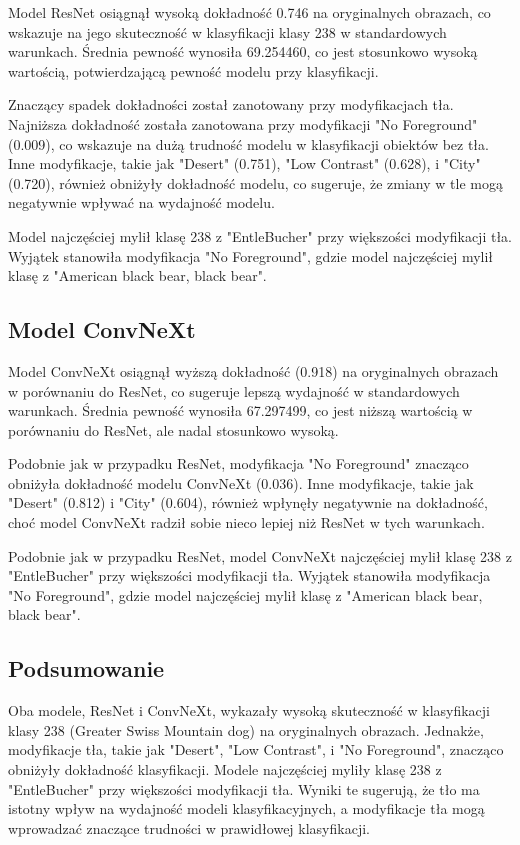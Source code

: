 Model ResNet osiągnął wysoką dokładność 0.746 na oryginalnych obrazach, co wskazuje na jego skuteczność w klasyfikacji klasy 238 w standardowych warunkach. Średnia pewność wynosiła 69.254460, co jest stosunkowo wysoką wartością, potwierdzającą pewność modelu przy klasyfikacji.

Znaczący spadek dokładności został zanotowany przy modyfikacjach tła. Najniższa dokładność została zanotowana przy modyfikacji "No Foreground" (0.009), co wskazuje na dużą trudność modelu w klasyfikacji obiektów bez tła. Inne modyfikacje, takie jak "Desert" (0.751), "Low Contrast" (0.628), i "City" (0.720), również obniżyły dokładność modelu, co sugeruje, że zmiany w tle mogą negatywnie wpływać na wydajność modelu.

Model najczęściej mylił klasę 238 z "EntleBucher" przy większości modyfikacji tła. Wyjątek stanowiła modyfikacja "No Foreground", gdzie model najczęściej mylił klasę z "American black bear, black bear".

\subsection*{Model ConvNeXt}

Model ConvNeXt osiągnął wyższą dokładność (0.918) na oryginalnych obrazach w porównaniu do ResNet, co sugeruje lepszą wydajność w standardowych warunkach. Średnia pewność wynosiła 67.297499, co jest niższą wartością w porównaniu do ResNet, ale nadal stosunkowo wysoką.

Podobnie jak w przypadku ResNet, modyfikacja "No Foreground" znacząco obniżyła dokładność modelu ConvNeXt (0.036). Inne modyfikacje, takie jak "Desert" (0.812) i "City" (0.604), również wpłynęły negatywnie na dokładność, choć model ConvNeXt radził sobie nieco lepiej niż ResNet w tych warunkach.

Podobnie jak w przypadku ResNet, model ConvNeXt najczęściej mylił klasę 238 z "EntleBucher" przy większości modyfikacji tła. Wyjątek stanowiła modyfikacja "No Foreground", gdzie model najczęściej mylił klasę z "American black bear, black bear".

\subsection*{Podsumowanie}

Oba modele, ResNet i ConvNeXt, wykazały wysoką skuteczność w klasyfikacji klasy 238 (Greater Swiss Mountain dog) na oryginalnych obrazach. Jednakże, modyfikacje tła, takie jak "Desert", "Low Contrast", i "No Foreground", znacząco obniżyły dokładność klasyfikacji. Modele najczęściej myliły klasę 238 z "EntleBucher" przy większości modyfikacji tła. Wyniki te sugerują, że tło ma istotny wpływ na wydajność modeli klasyfikacyjnych, a modyfikacje tła mogą wprowadzać znaczące trudności w prawidłowej klasyfikacji.


